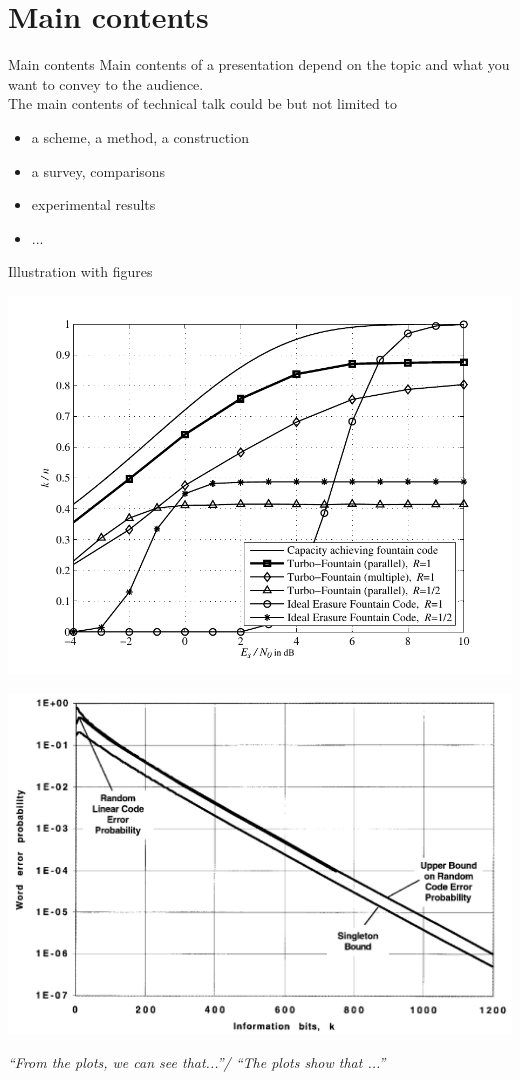 \documentclass[english,169,helvet]{ICEbeamerTUMCD}
\begin{document}
\section{Main contents}
\begin{frame}{Main contents}
  Main contents of a presentation depend on the topic and what you want to convey to the audience. \\The main contents of technical talk could be but not limited to
  \begin{itemize}
  \item a scheme, a method, a construction
  \item a survey, comparisons
  \item experimental results
  \item ...
  \end{itemize}
\end{frame}
\begin{frame}{Illustration with figures}
  \begin{minipage}[t]{0.5\linewidth}
    \includegraphics[width=\linewidth]{figs/plot_tf}
  \end{minipage}%
  \begin{minipage}[t]{0.5\linewidth}
    \includegraphics[width=\linewidth]{figs/boundBEC}
  \end{minipage}
  \textit{``From the plots, we can see that...''/ ``The plots show that ...''}
\end{frame}
\end{document}

